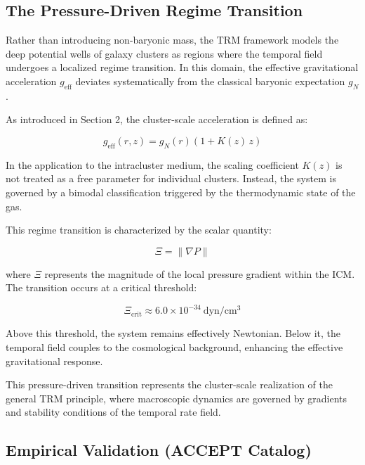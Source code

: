 \documentclass[11pt]{article}
\begin{document}
\subsection{The Pressure-Driven Regime Transition}

Rather than introducing non-baryonic mass, the TRM framework models the deep potential wells of galaxy clusters as regions where the temporal field undergoes a localized regime transition. In this domain, the effective gravitational acceleration $g_{\mathrm{eff}}$ deviates systematically from the classical baryonic expectation $g_N$.

As introduced in Section 2, the cluster-scale acceleration is defined as:

\begin{equation}
	g_{\mathrm{eff}}(r,z) = g_N(r)\left(1 + K(z)\,z\right)
\end{equation}

In the application to the intracluster medium, the scaling coefficient $K(z)$ is not treated as a free parameter for individual clusters. Instead, the system is governed by a bimodal classification triggered by the thermodynamic state of the gas.

This regime transition is characterized by the scalar quantity:

\begin{equation}
	\Xi = \|\nabla P\|
\end{equation}

where $\Xi$ represents the magnitude of the local pressure gradient within the ICM. The transition occurs at a critical threshold:

\begin{equation}
	\Xi_{\mathrm{crit}} \approx 6.0 \times 10^{-34}\ \mathrm{dyn/cm^3}
\end{equation}

Above this threshold, the system remains effectively Newtonian. Below it, the temporal field couples to the cosmological background, enhancing the effective gravitational response.

This pressure-driven transition represents the cluster-scale realization of the general TRM principle, where macroscopic dynamics are governed by gradients and stability conditions of the temporal rate field.

\subsection{Empirical Validation (ACCEPT Catalog)}
\end{document}
